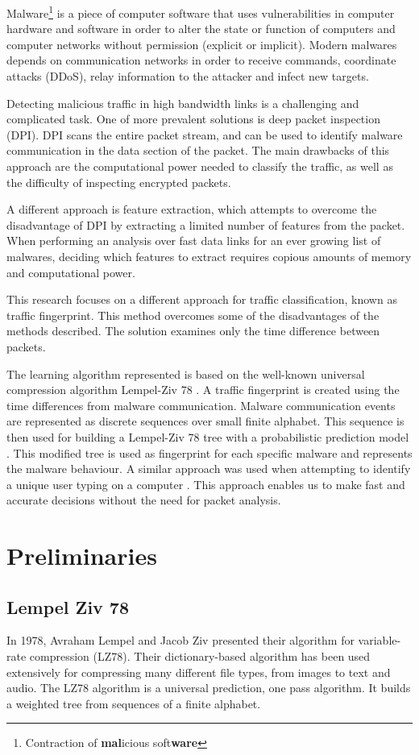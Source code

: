 \documentclass[9pt,journal,compsoc]{IEEEtran}
\begin{document}
Malware\footnote{Contraction of \textbf{mal}icious soft\textbf{ware}} is a piece of computer software that uses vulnerabilities in computer hardware and software in order to alter the state or function of computers and computer networks without permission (explicit or implicit). Modern malwares depends on communication networks in order to receive commands, coordinate attacks (DDoS), relay information to the attacker and infect new targets.

Detecting malicious traffic in high bandwidth links is a challenging and complicated task. One of more prevalent solutions is deep packet inspection (DPI). DPI scans the entire packet stream, and can be used to identify malware communication in the data section of the packet. The main drawbacks of this approach are the computational power needed to classify the traffic, as well as the difficulty of inspecting encrypted packets. 

A different approach is feature extraction, which attempts to overcome the disadvantage of DPI by extracting a limited number of features from the packet. When performing an analysis over fast data links for an ever growing list of malwares, deciding which features to extract requires copious amounts of memory and computational power.

This research focuses on a different approach for traffic classification, known as traffic fingerprint. This method overcomes some of the disadvantages of the methods described. The solution examines only the time difference between packets.

The learning algorithm represented is based on the well-known universal compression algorithm Lempel-Ziv 78 \cite{Lem78}. A traffic fingerprint is created using the time differences from malware communication. Malware communication events are represented as discrete sequences over small finite alphabet. This sequence is then used for building a Lempel-Ziv 78 tree with a probabilistic prediction model \cite{MFe92}. This modified tree is used as fingerprint for each specific malware and represents the malware behaviour. A similar approach was used when attempting to identify a unique user typing on a computer \cite{Nis03}.
This approach enables us to make fast and accurate decisions without the need for packet analysis.

\section{Preliminaries}
\subsection{Lempel Ziv 78}
In 1978, Avraham Lempel and Jacob Ziv presented their algorithm for variable-rate compression \cite{Lem78} (LZ78). Their dictionary-based algorithm has been used extensively for compressing many different file types, from images to text and audio.
The LZ78 algorithm is a universal prediction, one pass algorithm. It builds a weighted tree from sequences of a finite alphabet.
\end{document}
